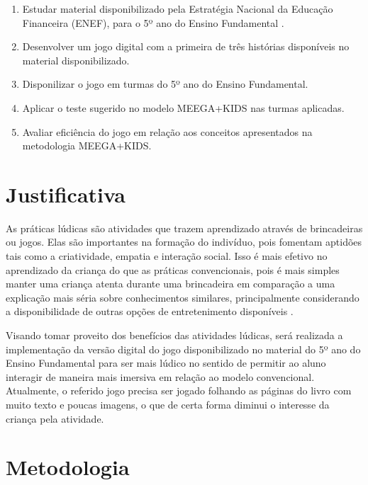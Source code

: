 \begin{enumerate}[noitemsep,nosep,labelindent=\parindent,leftmargin=*,label={\alph*}) ]

\item Estudar material disponibilizado pela Estratégia Nacional da Educação Financeira (ENEF), para o 5º
ano do Ensino Fundamental \cite{Educacao_financeira_nas_escolas}.

\item Desenvolver um jogo digital com a primeira de três histórias disponíveis no material disponibilizado.

\item Disponilizar o jogo em turmas do 5º ano do Ensino Fundamental.

\item Aplicar o teste sugerido no modelo MEEGA+KIDS \cite{MEEGA+KIDS} nas turmas aplicadas.

\item Avaliar eficiência do jogo em relação aos conceitos apresentados na metodologia MEEGA+KIDS.

\end{enumerate}

\section{Justificativa}

As práticas lúdicas são atividades que trazem aprendizado através de brincadeiras ou jogos. Elas são importantes na
formação do indivíduo, pois fomentam aptidões tais como a criatividade, empatia e interação social. Isso é mais
efetivo no aprendizado da criança do que as práticas convencionais, pois é mais simples manter uma criança atenta
durante uma brincadeira em comparação a uma explicação mais séria sobre conhecimentos similares, principalmente
considerando a disponibilidade de outras opções de entretenimento disponíveis \cite{Santos_Thayna_da_silva_2021}.

Visando tomar proveito dos benefícios das atividades lúdicas, será realizada a implementação da versão digital do
jogo disponibilizado no material do 5º ano do Ensino Fundamental para ser mais lúdico no sentido de permitir ao
aluno interagir de maneira mais imersiva em relação ao modelo convencional. Atualmente, o referido jogo precisa ser
jogado folhando as páginas do livro com muito texto e poucas imagens, o que de certa forma diminui o interesse da
criança pela atividade.

\section{Metodologia}

